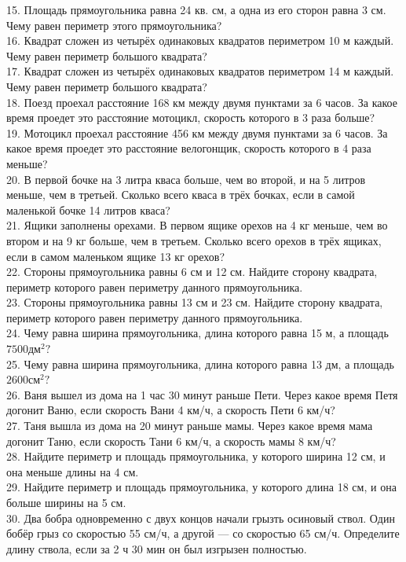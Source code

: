 \documentclass[12pt]{article}
\begin{document}
15. Площадь прямоугольника равна 24 кв. см, а одна из его сторон равна 3 см. Чему равен периметр этого прямоугольника?\\
16. Квадрат сложен из четырёх одинаковых квадратов периметром 10 м каждый. Чему равен периметр большого квадрата?\\
17. Квадрат сложен из четырёх одинаковых квадратов периметром 14 м каждый. Чему равен периметр большого квадрата?\\
18. Поезд проехал расстояние 168 км между двумя пунктами за 6 часов. За какое время проедет это расстояние мотоцикл, скорость которого в 3 раза больше?\\
19. Мотоцикл проехал расстояние 456 км между двумя пунктами за 6 часов. За какое время проедет это расстояние велогонщик, скорость которого в 4 раза меньше?\\
20. В первой бочке на 3 литра кваса больше, чем во второй, и на 5 литров меньше, чем в третьей. Сколько всего кваса в трёх бочках, если в самой маленькой бочке 14 литров кваса?\\
21. Ящики заполнены орехами. В первом ящике орехов на 4 кг меньше, чем во втором и на 9 кг больше, чем в третьем. Сколько всего орехов в трёх ящиках, если в самом маленьком ящике 13 кг орехов?\\
22. Стороны прямоугольника равны 6 см и 12 см. Найдите сторону квадрата, периметр которого равен периметру данного прямоугольника.\\
23. Стороны прямоугольника равны 13 см и 23 см. Найдите сторону квадрата, периметр которого равен периметру данного прямоугольника.\\
24. Чему равна ширина прямоугольника, длина которого равна 15 м, а площадь $7500\text{дм}^2?$\\
25. Чему равна ширина прямоугольника, длина которого равна 13 дм, а площадь $2600\text{см}^2?$\\
26. Ваня вышел из дома на 1 час 30 минут раньше Пети. Через какое время Петя догонит Ваню, если скорость Вани 4 км/ч, а скорость Пети 6 км/ч?\\
27. Таня вышла из дома на 20 минут раньше мамы. Через какое время мама догонит Таню, если скорость Тани 6 км/ч, а скорость мамы 8 км/ч?\\
28. Найдите периметр и площадь прямоугольника, у которого ширина 12 см, и она меньше длины на 4 см.\\
29. Найдите периметр и площадь прямоугольника, у которого длина 18 см, и она больше ширины на 5 см.\\
30. Два бобра одновременно с двух концов начали грызть осиновый ствол. Один бобёр грыз со скоростью 55 см/ч, а другой --- со скоростью 65 см/ч. Определите длину ствола, если за 2 ч 30 мин он был изгрызен полностью.\\
\end{document}
